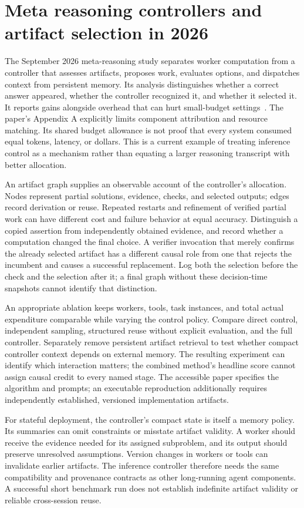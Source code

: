 \section{Meta reasoning controllers and artifact selection in 2026}
\label{sec:C09:meta2026}
The September 2026 meta-reasoning study separates worker computation from a controller that assesses artifacts, proposes work, evaluates options, and dispatches context from persistent memory. Its analysis distinguishes whether a correct answer appeared, whether the controller recognized it, and whether it selected it. It reports gains alongside overhead that can hurt small-budget settings~\cite{rewrite_metareasoning2026}. The paper's Appendix A explicitly limits component attribution and resource matching. Its shared budget allowance is not proof that every system consumed equal tokens, latency, or dollars. This is a current example of treating inference control as a mechanism rather than equating a larger reasoning transcript with better allocation.

An artifact graph supplies an observable account of the controller's allocation. Nodes represent partial solutions, evidence, checks, and selected outputs; edges record derivation or reuse. Repeated restarts and refinement of verified partial work can have different cost and failure behavior at equal accuracy. Distinguish a copied assertion from independently obtained evidence, and record whether a computation changed the final choice. A verifier invocation that merely confirms the already selected artifact has a different causal role from one that rejects the incumbent and causes a successful replacement. Log both the selection before the check and the selection after it; a final graph without these decision-time snapshots cannot identify that distinction.

An appropriate ablation keeps workers, tools, task instances, and total actual expenditure comparable while varying the control policy. Compare direct control, independent sampling, structured reuse without explicit evaluation, and the full controller. Separately remove persistent artifact retrieval to test whether compact controller context depends on external memory. The resulting experiment can identify which interaction matters; the combined method's headline score cannot assign causal credit to every named stage. The accessible paper specifies the algorithm and prompts; an executable reproduction additionally requires independently established, versioned implementation artifacts.

For stateful deployment, the controller's compact state is itself a memory policy. Its summaries can omit constraints or misstate artifact validity. A worker should receive the evidence needed for its assigned subproblem, and its output should preserve unresolved assumptions. Version changes in workers or tools can invalidate earlier artifacts. The inference controller therefore needs the same compatibility and provenance contracts as other long-running agent components. A successful short benchmark run does not establish indefinite artifact validity or reliable cross-session reuse.



